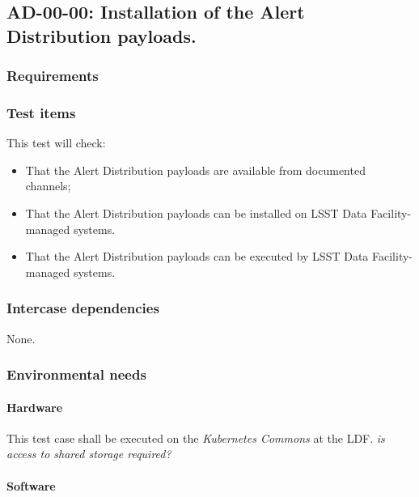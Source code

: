 \subsection{AD-00-00: Installation of the Alert Distribution payloads.}
\label{ad-00-00}

\subsubsection{Requirements}

\subsubsection{Test items}

This test will check:

\begin{itemize}

  \item{That the Alert Distribution payloads are available 
  from documented channels;}

  \item{That the Alert Distribution payloads can be installed on
  LSST Data Facility-managed systems.}

  \item{That the Alert Distribution payloads can be executed by
  LSST Data Facility-managed systems.}

\end{itemize}

\subsubsection{Intercase dependencies}

None.

\subsubsection{Environmental needs}

\paragraph{Hardware}

This test case shall be executed on the \textit{Kubernetes Commons} at the LDF. 
\textit{is access to shared storage required?}

\paragraph{Software}

